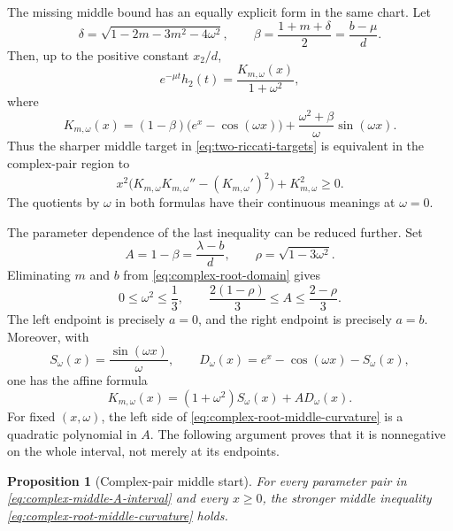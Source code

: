 \documentclass[11pt]{article}
\newtheorem{proposition}[theorem]{Proposition}
\theoremstyle{remark}
\begin{document}
The missing middle bound has an equally explicit form in the same chart.
Let
\[
 \delta=\sqrt{1-2m-3m^2-4\omega^2},\qquad
 \beta=\frac{1+m+\delta}{2}=\frac{b-\mu}{d}.
\]
Then, up to the positive constant $x_2/d$,
\[
 e^{-\mu t}h_2(t)=\frac{K_{m,\omega}(x)}{1+\omega^2},
\]
where
\[
 K_{m,\omega}(x)
 =(1-\beta)\bigl(e^x-\cos(\omega x)\bigr)
 +\frac{\omega^2+\beta}{\omega}\sin(\omega x).
\]
Thus the sharper middle target in \eqref{eq:two-riccati-targets} is equivalent
in the complex-pair region to
\begin{equation}\label{eq:complex-root-middle-curvature}
 x^2\bigl(K_{m,\omega}K_{m,\omega}''-(K_{m,\omega}')^2\bigr)
 +K_{m,\omega}^2\geq0.
\end{equation}
The quotients by $\omega$ in both formulas have their continuous meanings at
$\omega=0$.

The parameter dependence of the last inequality can be reduced further.  Set
\[
 A=1-\beta=\frac{\lambda-b}{d},\qquad
 \rho=\sqrt{1-3\omega^2}.
\]
Eliminating $m$ and $b$ from \eqref{eq:complex-root-domain} gives
\begin{equation}\label{eq:complex-middle-A-interval}
 0\leq\omega^2\leq\frac13,\qquad
 \frac{2(1-\rho)}3\leq A\leq\frac{2-\rho}3.
\end{equation}
The left endpoint is precisely $a=0$, and the right endpoint is precisely
$a=b$.  Moreover, with
\[
 S_\omega(x)=\frac{\sin(\omega x)}{\omega},\qquad
 D_\omega(x)=e^x-\cos(\omega x)-S_\omega(x),
\]
one has the affine formula
\begin{equation}\label{eq:complex-middle-affine}
 K_{m,\omega}(x)=(1+\omega^2)S_\omega(x)+A D_\omega(x).
\end{equation}
For fixed $(x,\omega)$, the left side of
\eqref{eq:complex-root-middle-curvature} is a quadratic polynomial in $A$.
The following argument proves that it is nonnegative on the whole interval,
not merely at its endpoints.

\begin{proposition}[Complex-pair middle start]
\label{prop:complex-middle}
For every parameter pair in \eqref{eq:complex-middle-A-interval} and every
$x\geq0$, the stronger middle inequality
\eqref{eq:complex-root-middle-curvature} holds.
\end{proposition}
\end{document}
